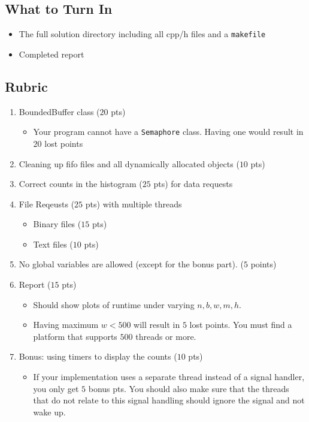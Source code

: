 \documentclass[12pt]{article}
\begin{document}
	
\subsection*{What to Turn In}	

\begin{itemize}
	
	\item The full solution directory including all cpp/h files and a \texttt{makefile}
	\item Completed report
\end{itemize}


\subsection*{Rubric}	

\begin{enumerate}
	\item BoundedBuffer class ($20$ pts)
		\begin{itemize}
			\item Your program cannot have a \texttt{Semaphore} class. Having one would result in $20$ lost points
		\end{itemize}
	\item Cleaning up fifo files and all dynamically allocated objects ($10$ pts)
	\item Correct counts in the histogram ($25$ pts) for data requests
	\item File Reqeusts ($25$ pts) with multiple threads
		\begin{itemize} 
			\item Binary files ($15$ pts)
			\item Text files  ($10$ pts)
		\end{itemize}		
	\item No global variables are allowed (except for the bonus part). ($5$ points) 
	\item Report ($15$ pts)
		\begin{itemize}
			\item Should show plots  of runtime under  varying $n, b, w, m, h$.
			\item Having maximum $w < 500$ will result in $5$ lost points. You must find a platform that supports $500$ threads or more.
		\end{itemize}
	\item Bonus: using timers to display the counts ($10$ pts)
		\begin{itemize}
			\item If your implementation uses a separate thread instead of a signal handler, you only get $5$ bonus pts. You should also make sure that the threads that do not relate to this signal handling should ignore the signal and not wake up.
		\end{itemize}
	
\end{enumerate}
\end{document}
